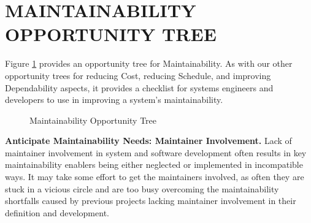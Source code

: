 \section{MAINTAINABILITY OPPORTUNITY TREE}
\label{sec:opportunity_tree}
Figure \ref{fig:opportunity_tree} provides an opportunity tree for Maintainability.   As with our other opportunity trees for reducing Cost, reducing Schedule, and improving Dependability aspects, it provides a checklist for systems engineers and developers to use in improving a system's maintainability.


\begin{figure}[h]
	\vspace{-0.3cm}
	\centering
	\caption{Maintainability Opportunity Tree}
	\label{fig:opportunity_tree}
\end{figure}



\textbf{Anticipate Maintainability Needs: Maintainer Involvement.}
Lack of maintainer involvement in system and software development often results in key maintainability enablers being either neglected or implemented in incompatible ways.   It may take some effort to get the maintainers involved, as often they are stuck in a vicious circle and are too busy overcoming the maintainability shortfalls caused by previous projects lacking maintainer involvement in their definition and development.

